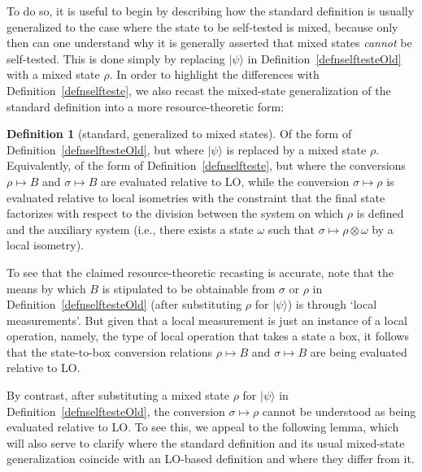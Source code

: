 \documentclass[prx,11pt,letterpaper,twocolumn,accepted=2023-11-27]{quantumarticle}
\theoremstyle{plain}
\theoremstyle{definition}
\newtheorem{defn}{Definition}
\begin{document}
To do so, it is useful to begin by describing how the standard definition is usually generalized to the case where the state to be self-tested is mixed, because only then can one understand why it is generally asserted that mixed states {\em cannot} be self-tested.
 This is done simply by replacing $|\psi\rangle$ in Definition~\ref{defnselftesteOld}  with a mixed state $\rho$.  In order to highlight the differences with 
 Definition~\ref{defnselfteste}, we also recast the mixed-state generalization of the standard definition into a more resource-theoretic form: 
\begin{defn}[standard, generalized to mixed states]
\label{defnselftesteMixed}
Of the form of Definition~\ref{defnselftesteOld}, but where $|\psi\rangle$ is replaced by a mixed state $\rho$.
Equivalently, of the form of Definition~\ref{defnselfteste}, but where the conversions $\rho \mapsto B$ and $\sigma \mapsto B$ are evaluated relative to LO, while the conversion $\sigma \mapsto \rho$ is evaluated relative to local isometries with the constraint that the final state factorizes with respect to the division between the system on which $\rho$ is defined and the auxiliary system (i.e., there exists a state $\omega$ 
 such that $\sigma \mapsto \rho \otimes \omega$ by a local isometry).
\end{defn}

To see that the claimed resource-theoretic recasting is accurate, note that the means by which $B$ is stipulated to be obtainable from $\sigma$ or $\rho$ in Definition~\ref{defnselftesteOld} (after substituting $\rho$ for $|\psi\rangle$)
  is through `local measurements'.
  But given that a local measurement is just  an instance of a local operation, namely, the type of local operation that takes a state a box, it follows that the state-to-box conversion relations $\rho \mapsto B$ and $\sigma \mapsto B$ 
are being evaluated relative to LO.

By contrast, after substituting a mixed state $\rho$ for $|\psi\rangle$ in Definition~\ref{defnselftesteOld},  the conversion $\sigma \mapsto \rho$  cannot be understood as being evaluated relative to LO. 
To see this, we appeal to the following lemma, which will also serve to clarify where the standard definition and its usual mixed-state generalization  coincide with an LO-based definition and where they  differ from it. 
\end{document}
